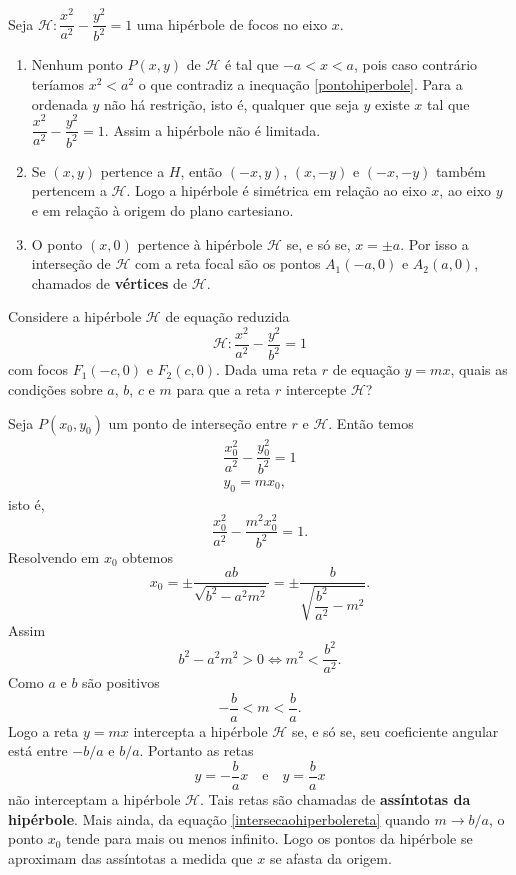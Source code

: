 \begin{observacao}
    Seja $\mathcal{H} : \dfrac{x^2}{a^2} - \dfrac{y^2}{b^2} = 1$ uma hipérbole de focos no eixo $x$.
    \begin{enumerate}
        \item Nenhum ponto $P(x,y)$ de $\mathcal{H}$ é tal que $-a < x < a$, pois caso contrário teríamos $x^2 < a^2$ o que contradiz a inequação
              \eqref{pontohiperbole}. Para a ordenada $y$ não há restrição, isto é, qualquer que seja $y$ existe $x$ tal que
              $\dfrac{x^2}{a^2} - \dfrac{y^2}{b^2} = 1$. Assim a hipérbole não é limitada.
        \item Se $(x,y)$ pertence a $H$, então $(-x,y)$, $(x,-y)$ e $(-x,-y)$ também pertencem a $\mathcal{H}$. Logo a hipérbole é simétrica em
              relação ao eixo $x$, ao eixo $y$  e em relação à origem do plano cartesiano.
        \item O ponto $(x,0)$ pertence à hipérbole $\mathcal{H}$ se, e só se, $x = \pm a$. Por isso a interseção de $\mathcal{H}$ com a reta focal são os
              pontos $A_1(-a,0)$ e $A_2(a,0)$, chamados de \textbf{vértices} de $\mathcal{H}$.
    \end{enumerate}
\end{observacao}

Considere a hipérbole $\mathcal{H}$ de equação reduzida
\[
    \mathcal{H} : \dfrac{x^2}{a^2} - \dfrac{y^2}{b^2} = 1
\]
com focos $F_1(-c,0)$ e $F_2(c,0)$. Dada uma reta $r$ de equação $y = mx$, quais as condições sobre $a$, $b$, $c$ e $m$ para que a reta $r$ intercepte
$\mathcal{H}$?

Seja $P(x_0,y_0)$ um ponto de interseção entre $r$ e $\mathcal{H}$. Então temos
\begin{align*}
    \dfrac{x_0^2}{a^2} - \dfrac{y_0^2}{b^2} = 1 \\
    y_0 = mx_0,
\end{align*}
isto é,
\[
    \dfrac{x_0^2}{a^2} - \dfrac{m^2x_0^2}{b^2} = 1.
\]
Resolvendo em $x_0$ obtemos
\begin{equation}\label{intersecaohiperbolereta}
    x_0 = \pm \dfrac{ab}{\sqrt{b^2 - a^2m^2}} = \pm \dfrac{b}{\sqrt{\dfrac{b^2}{a^2} - m^2}}.
\end{equation}
Assim
\[
    b^2 - a^2m^2 > 0 \Leftrightarrow m^2 < \dfrac{b^2}{a^2}.
\]
Como $a$ e $b$ são positivos
\[
    -\dfrac{b}{a} < m < \dfrac{b}{a}.
\]
Logo a reta $y = mx$ intercepta a hipérbole $\mathcal{H}$ se, e só se, seu coeficiente angular está entre $-b/a$ e $b/a$. Portanto as retas
\[
    y = -\dfrac{b}{a}x \quad \mbox{e}\quad y = \dfrac{b}{a}x
\]
não interceptam a hipérbole $\mathcal{H}$. Tais retas são chamadas de \textbf{assíntotas da hipérbole}. Mais ainda, da equação \eqref{intersecaohiperbolereta}
quando $m \to b/a$, o ponto $x_0$ tende para mais ou menos infinito. Logo os pontos da hipérbole se aproximam das assíntotas a medida que $x$ se
afasta da origem.

